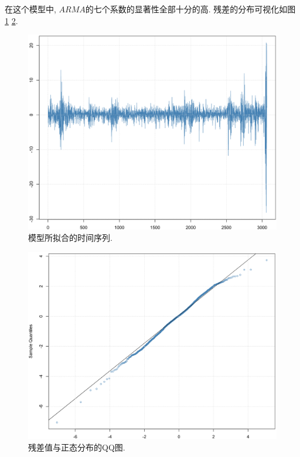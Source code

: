 \documentclass[12pt]{article}
\begin{document}
\qquad 在这个模型中, $ARMA$的七个系数的显著性全部十分的高. 残差的分布可视化如图 \ref{fig:17} \ref{fig:18}.
\begin{center}
    \hspace{30pt}\begin{minipage}{0.45\textwidth}
        \begin{figure}
            \centering
            \hspace{-25pt}\includegraphics[width=.9\textwidth]{output_52_0}
            \caption{模型所拟合的时间序列.\label{fig:17}}
        \end{figure}
    \end{minipage}
    \begin{minipage}{0.45\textwidth}
        \begin{figure}
            \centering
            \hspace{-25pt}\includegraphics[width=.9\textwidth]{output_53_0}
            \caption{残差值与正态分布的QQ图.\label{fig:18}}
        \end{figure}
    \end{minipage}
\end{center}
\end{document}
